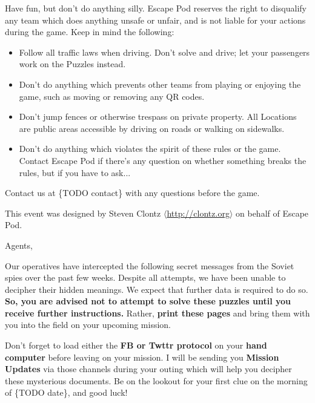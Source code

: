 \documentclass{puzzlehunt}
\begin{document}

Have fun, but don't do anything silly. Escape Pod reserves the right to
disqualify any team which does anything unsafe or unfair, and is not liable
for your actions during the game. Keep in mind the following:

\begin{itemize}
  \item Follow all traffic laws when driving. Don't solve and drive; let your
    passengers work on the Puzzles instead.
  \item Don't do anything which prevents other teams from playing or enjoying
    the game, such as moving or removing any QR codes.
  \item Don't jump fences or otherwise trespass on private property. All
    Locations are public areas accessible by driving on roads or walking on
    sidewalks.
  \item Don't do anything which violates the spirit of these rules or the game.
    Contact Escape Pod if there's any question on whether something breaks
    the rules, but if you have to ask...
\end{itemize}


Contact us at \{TODO contact\} with any questions before the game.

\vfill

{\footnotesize This event was designed by Steven Clontz
\(\langle\)\url{http://clontz.org}\(\rangle\) on behalf of Escape Pod.}



\noindent Agents,

Our operatives have intercepted the following secret messages from the
Soviet spies over the past few weeks. Despite all attempts, we have been
unable to decipher their hidden meanings. We expect that further data
is required to do so.
\textbf{So, you are advised not to attempt to solve these puzzles until you
receive further instructions.} Rather, \textbf{print these pages} and
bring them with you into the field on your upcoming mission.

Don't forget to load either the \textbf{FB or Twttr protocol} on your
\textbf{hand computer} before leaving on your mission. I will be sending
you \textbf{Mission Updates} via those channels during your outing which
will help you decipher these mysterious documents. Be on the lookout for
your first clue on the morning of \{TODO date\}, and good luck!
\end{document}
